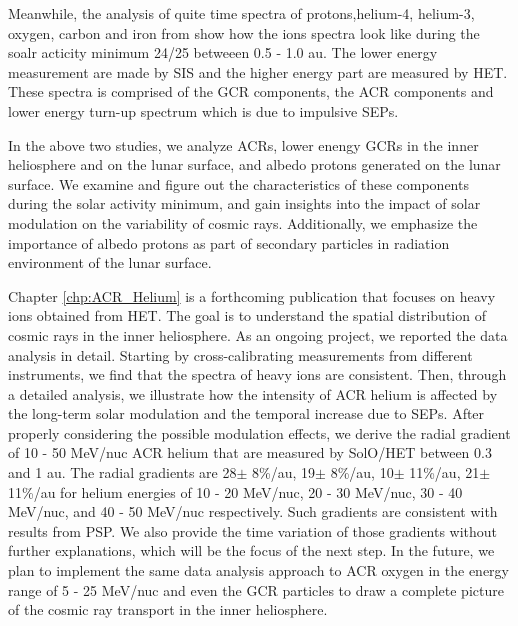  
Meanwhile, the analysis of quite time spectra of protons,helium-4, helium-3, oxygen, carbon and iron from \citet{Mason-2021-SolOQuietTime} show how the ions spectra look like during the soalr acticity minimum 24/25 betweeen 0.5 - 1.0 au. The lower energy measurement are made by \acs{SIS} and the higher energy part are measured by \acs{HET}. These spectra is comprised of the \ac{GCR} components, the \ac{ACR} components and lower energy turn-up spectrum which is due to impulsive \acp{SEP}. %

In the above two studies, we analyze \acp{ACR}, lower enengy \acp{GCR} in the inner heliosphere and on the lunar surface, and albedo protons generated on the lunar surface. We examine and figure out the characteristics of these components during the solar activity minimum, and gain insights into the impact of solar modulation on the variability of cosmic rays. Additionally, we emphasize the importance of albedo protons as part of secondary particles in radiation environment of the lunar surface.





Chapter \ref{chp:ACR_Helium} is a forthcoming publication that focuses on heavy ions obtained from \ac{HET}. The goal is to understand the spatial distribution of cosmic rays in the inner heliosphere. As an ongoing project, we reported the data analysis in detail. Starting by cross-calibrating measurements from different instruments, we find that the spectra of heavy ions are consistent. Then, through a detailed analysis, we illustrate how the intensity of \ac{ACR} helium is affected by the long-term solar modulation and the temporal increase due to \acp{SEP}.
After properly considering the possible modulation effects, we derive the radial gradient of 10 - 50 MeV/nuc \ac{ACR} helium that are measured by \ac{SolO}/\ac{HET} between 0.3 and 1 au. The radial gradients are 28$\pm$ 8\%/au, 19$\pm$ 8\%/au, 10$\pm$ 11\%/au, 21$\pm$ 11\%/au for helium energies of 10 - 20 MeV/nuc, 20 - 30 MeV/nuc, 30 - 40 MeV/nuc, and 40 - 50 MeV/nuc respectively.
Such gradients are consistent with results from \ac{PSP}. We also provide the time variation of those gradients without further explanations, which will be the focus of the next step. In the future,  we plan to implement the same data analysis approach to \ac{ACR} oxygen in the energy range of 5 - 25 MeV/nuc and even the \ac{GCR} particles to draw a complete picture of the cosmic ray transport in the inner heliosphere.



